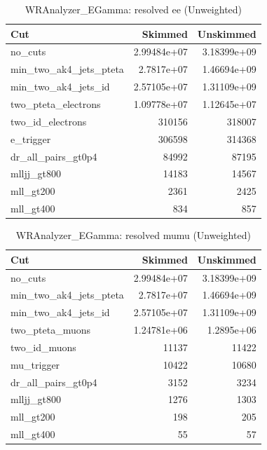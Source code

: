 \documentclass{article}
\begin{document}
\begin{table}[htbp]
\centering
\caption{WRAnalyzer\_EGamma: resolved ee (Unweighted)}
\begin{tabular}{lrr}
\hline
Cut & Skimmed & Unskimmed \\
\hline
no\_cuts & 2.99484e+07 & 3.18399e+09 \\
min\_two\_ak4\_jets\_pteta & 2.7817e+07 & 1.46694e+09 \\
min\_two\_ak4\_jets\_id & 2.57105e+07 & 1.31109e+09 \\
two\_pteta\_electrons & 1.09778e+07 & 1.12645e+07 \\
two\_id\_electrons & 310156 & 318007 \\
e\_trigger & 306598 & 314368 \\
dr\_all\_pairs\_gt0p4 & 84992 & 87195 \\
mlljj\_gt800 & 14183 & 14567 \\
mll\_gt200 & 2361 & 2425 \\
mll\_gt400 & 834 & 857 \\
\hline
\end{tabular}
\end{table}

\begin{table}[htbp]
\centering
\caption{WRAnalyzer\_EGamma: resolved mumu (Unweighted)}
\begin{tabular}{lrr}
\hline
Cut & Skimmed & Unskimmed \\
\hline
no\_cuts & 2.99484e+07 & 3.18399e+09 \\
min\_two\_ak4\_jets\_pteta & 2.7817e+07 & 1.46694e+09 \\
min\_two\_ak4\_jets\_id & 2.57105e+07 & 1.31109e+09 \\
two\_pteta\_muons & 1.24781e+06 & 1.2895e+06 \\
two\_id\_muons & 11137 & 11422 \\
mu\_trigger & 10422 & 10680 \\
dr\_all\_pairs\_gt0p4 & 3152 & 3234 \\
mlljj\_gt800 & 1276 & 1303 \\
mll\_gt200 & 198 & 205 \\
mll\_gt400 & 55 & 57 \\
\hline
\end{tabular}
\end{table}
\end{document}
